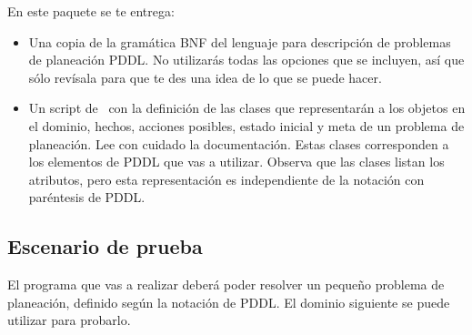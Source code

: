 En este paquete se te entrega:
\begin{itemize}
 \item Una copia de la gramática BNF del lenguaje para descripción de problemas de planeación PDDL.
       No utilizarás todas las opciones que se incluyen, así que sólo revísala para que te des una 
       idea de lo que se puede hacer.
 \item Un script de \Python\ con la definición de las clases que representarán a los objetos en
       el dominio, hechos, acciones posibles, estado inicial y meta de un problema de planeación.
       Lee con cuidado la documentación.  Estas clases corresponden a los elementos de PDDL que
       vas a utilizar.  Observa que las clases listan los atributos, pero esta representación es
       independiente de la notación con paréntesis de PDDL.
\end{itemize}


\subsection{Escenario de prueba}

El programa que vas a realizar deberá poder resolver un pequeño problema de planeación, definido según la notación de PDDL.  El dominio siguiente se puede utilizar para probarlo.

